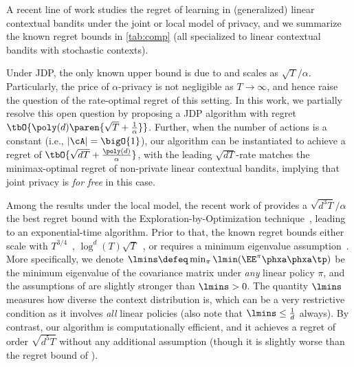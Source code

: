 

A recent line of work studies the regret of learning in (generalized) linear contextual bandits under the joint or local model of privacy, and we summarize the known regret bounds in \cref{tab:comp} (all specialized to linear contextual bandits with stochastic contexts). 

Under JDP, the only known upper bound is due to \citet{shariff2018differentially} and scales as $\sqrt{T}/\alpha$. Particularly, the price of $\alpha$-privacy is not negligible as $T\to \infty$, and hence \citet{azize2024open} raise the question of the rate-optimal regret of this setting. In this work, we partially resolve this open question by proposing a JDP algorithm with regret $\tbO{\poly(d)\paren{\sqrt{T}+\frac{1}{\alpha}}}$. Further, when the number of actions is a constant (i.e., $|\cA|=\bigO{1}$), our algorithm can be instantiated to achieve a regret of $\tbO{\sqrt{dT}+\frac{\poly(d)}{\alpha}}$, with the leading $\sqrt{dT}$-rate matches the minimax-optimal regret of non-private linear contextual bandits, implying that joint privacy is \emph{for free} in this case.


Among the results under the local model, the recent work of \citet{chen2024private} provides a $\sqrt{d^3T}/\alpha$ the best regret bound with the Exploration-by-Optimization technique~\citep{lattimore2020exploration,foster2022complexity}, leading to an exponential-time algorithm. Prior to that, the known regret bounds either scale with $T^{3/4}$~\citep{zheng2020locally}, $\log^d(T)\sqrt{T}$~\citep{li2024optimal}, or requires a minimum eigenvalue assumption~\citep{han2021generalized}. More specifically, we denote $\lmins\defeq \min_{\pi}\lmin(\EE^{\pi}\phxa\phxa\tp)$ be the minimum eigenvalue of the covariance matrix under \emph{any} linear policy $\pi$, and the assumptions of \citet{han2021generalized} are slightly stronger than $\lmins>0$. The quantity $\lmins$ measures how diverse the context distribution is, which can be a very restrictive condition as it involves \emph{all} linear policies (also note that $\lmins\leq \frac{1}{d}$ always). By contrast, our algorithm is computationally efficient, and it achieves a regret of order $\sqrt{d^5T}$ without any additional assumption (though it is slightly worse than the regret bound of \citet{chen2024private}).


